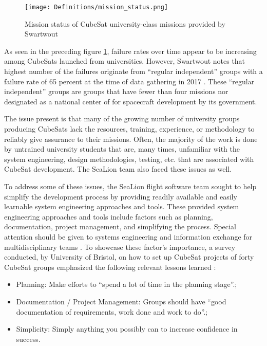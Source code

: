 \documentclass[journal,article,submit,pdftex,moreauthors]{Definitions/mdpi}
\begin{document}
\begin{figure}[H]
    \texttt{[image: Definitions/mission\_status.png]}
    \caption{Mission status of CubeSat university-class missions provided by Swartwout}
	\label{fig:mission_status}
    \end{figure}
	\noindent   
\unskip

As seen in the preceding figure \ref{fig:mission_status}, failure rates over time appear to be increasing among CubeSats launched from universities.  However, Swartwout notes that highest number of the failures originate from “regular independent” groups with a failure rate of 65 percent at the time of data gathering in 2017 \cite{reliving_24}.  These “regular independent” groups are groups that have fewer than four missions nor designated as a national center of for spacecraft development by its government. 

The issue present is that many of the growing number of university groups producing CubeSats lack the resources, training, experience, or methodology to reliably give assurance to their missions.  Often, the majority of the work is done by untrained university students that are, many times, unfamiliar with the system engineering, design methodologies, testing, etc. that are associated with CubeSat development.  The SeaLion team also faced these issues as well.

To address some of these issues, the SeaLion flight software team sought to help simplify the development process by providing readily available and easily learnable system engineering approaches and tools.  These provided system engineering approaches and tools include factors such as planning, documentation, project management, and simplifying the process.  Special attention should be given to systems engineering and information exchange for multidisciplinary teams \cite{aalto}.  To showcase these factor's importance, a survey conducted, by University of Bristol, on how to set up CubeSat projects of forty CubeSat groups emphasized the following relevant lessons learned \cite{howtosetup}:

\begin{itemize}
	\item	Planning: Make efforts to “spend a lot of time in the planning stage”.;
	\item	Documentation / Project Management: Groups should have “good documentation of requirements, work done and work to do”.;
	\item	Simplicity: Simply anything you possibly can to increase confidence in success.
\end{itemize}
\end{document}
